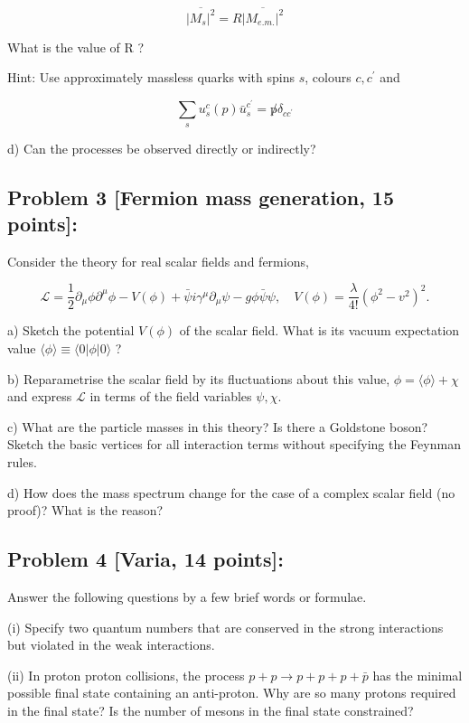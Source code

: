 \documentclass[10pt, letterpaper]{article}
\begin{document}
$$
\overline{\left|M_s\right|^2}=R \overline{\left|M_{e . m .}\right|^2}
$$

What is the value of R ?

Hint: Use approximately massless quarks with spins $s$, colours $c, c^{\prime}$ and

$$
\sum_s u_s^c(p) \bar{u}_s^{c^{\prime}}=\not p \delta_{c c^{\prime}}
$$

d) Can the processes be observed directly or indirectly?



\subsection{Problem 3 [Fermion mass generation, 15 points]:}


Consider the theory for real scalar fields and fermions,

$$
\mathcal{L}=\frac{1}{2} \partial_\mu \phi \partial^\mu \phi-V(\phi)+\bar{\psi} i \gamma^\mu \partial_\mu \psi-g \phi \bar{\psi} \psi, \quad V(\phi)=\frac{\lambda}{4!}\left(\phi^2-v^2\right)^2 .
$$

a) Sketch the potential $V(\phi)$ of the scalar field. What is its vacuum expectation value $\langle\phi\rangle \equiv\langle 0| \phi|0\rangle$ ?

b) Reparametrise the scalar field by its fluctuations about this value, $\phi=\langle\phi\rangle+\chi$ and express $\mathcal{L}$ in terms of the field variables $\psi, \chi$.

c) What are the particle masses in this theory? Is there a Goldstone boson? Sketch the basic vertices for all interaction terms without specifying the Feynman rules.

d) How does the mass spectrum change for the case of a complex scalar field (no proof)? What is the reason?




\subsection{Problem 4 [Varia, 14 points]:}

Answer the following questions by a few brief words or formulae.

(i) Specify two quantum numbers that are conserved in the strong interactions but violated in the weak interactions.

(ii) In proton proton collisions, the process $p+p \rightarrow p+p+p+\bar{p}$ has the minimal possible final state containing an anti-proton. Why are so many protons required in the final state? Is the number of mesons in the final state constrained?
\end{document}
